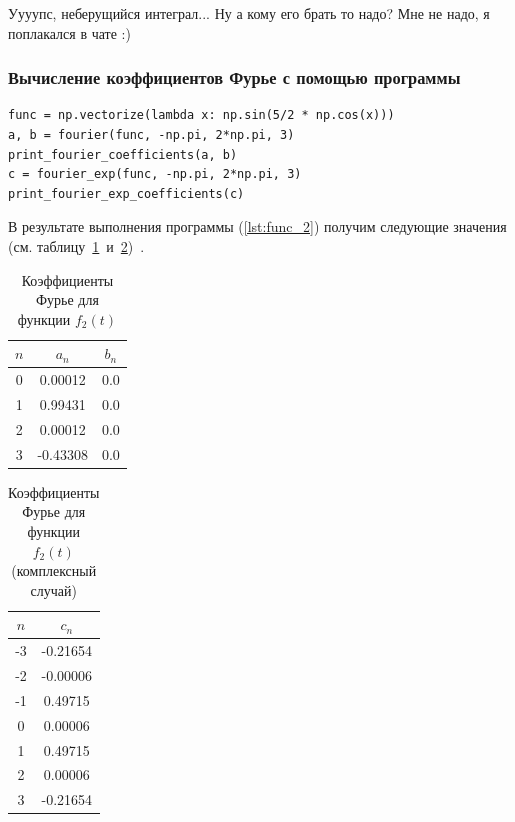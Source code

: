 Уууупс, неберущийся интеграл... Ну а кому его брать то надо? Мне не надо, я поплакался в чате :)

\subsubsection{Вычисление коэффициентов Фурье с помощью программы}

\begin{lstlisting}[style=python_white, caption=Вычисление коэффициентов Фурье, label=lst:func_2]
func = np.vectorize(lambda x: np.sin(5/2 * np.cos(x)))
a, b = fourier(func, -np.pi, 2*np.pi, 3)
print_fourier_coefficients(a, b)
c = fourier_exp(func, -np.pi, 2*np.pi, 3)
print_fourier_exp_coefficients(c)
\end{lstlisting}

В результате выполнения программы (\ref{lst:func_2}) получим следующие значения (см. таблицу~\ref{tab:func_2}~и~\ref{tab:func_2_exp})~.

\begin{table}[h!]
    \centering
    \begin{tabular}{|c|c|c|}
        \hline
        $n$ & $a_n$ & $b_n$ \\
        \hline
        0 & 0.00012 & 0.0\\
        1 & 0.99431 & 0.0\\
        2 & 0.00012 & 0.0\\
        3 & -0.43308 & 0.0\\
        \hline
    \end{tabular}
    \caption{Коэффициенты Фурье для функции $f_2(t)$}
    \label{tab:func_2}
\end{table}

\begin{table}[h!]
    \centering
    \begin{tabular}{|c|c|}
        \hline
        $n$ & $c_n$ \\
        \hline
        -3 & -0.21654 \\
        -2 & -0.00006 \\
        -1 & 0.49715 \\
        0 & 0.00006 \\
        1 & 0.49715 \\
        2 & 0.00006 \\
        3 & -0.21654 \\
        \hline
    \end{tabular}
    \caption{Коэффициенты Фурье для функции $f_2(t)$ (комплексный случай)}
    \label{tab:func_2_exp}
\end{table}

